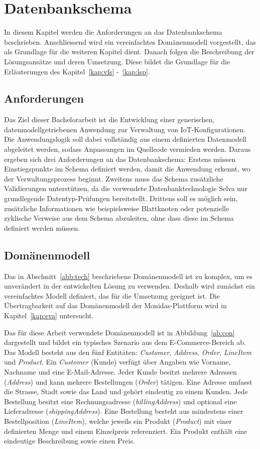 \section{Datenbankschema}
\label{kap:dbschema}
In diesem Kapitel werden die Anforderungen an das Datenbankschema beschrieben. Anschliessend wird ein vereinfachtes Domänenmodell vorgestellt, das als Grundlage für die weiteren Kapitel dient. Danach folgen die Beschreibung der Lösungsansätze und deren Umsetzung. Diese bildet die Grundlage für die Erläuterungen des Kapitel~\ref{kap:vfs} -~\ref{kap:lsp}.

\subsection{Anforderungen}
\label{abb:anforderungen}
Das Ziel dieser Bachelorarbeit ist die Entwicklung einer generischen, datenmodellgetriebenen Anwendung zur Verwaltung von IoT-Konfigurationen. Die Anwendungslogik soll dabei vollständig aus einem definierten Datenmodell abgeleitet werden, sodass Anpassungen im Quellcode vermieden werden. Daraus ergeben sich drei Anforderungen an das Datenbankschema: Erstens müssen Einstiegspunkte im Schema definiert werden, damit die Anwendung erkennt, wo der Verwaltungsprozess beginnt. Zweitens muss das Schema zusätzliche Validierungen unterstützen, da die verwendete Datenbanktechnologie Selva nur grundlegende Datentyp-Prüfungen bereitstellt. Drittens soll es möglich sein, zusätzliche Informationen wie beispielsweise Blattknoten oder potenzielle zyklische Verweise aus dem Schema abzuleiten, ohne dass diese im Schema definiert werden müssen.

\subsection{Domänenmodell}
\label{abb:domaenenmodell}
Das in Abschnitt~\ref{abb:tech} beschriebene Domänenmodell ist zu komplex, um es unverändert in der entwickelten Lösung zu verwenden. Deshalb wird zunächst ein vereinfachtes Modell definiert, das für die Umsetzung geeignet ist. Die Übertragbarkeit auf das Domänenmodell der Monidas-Plattform wird in Kapitel~\ref{kap:eva} untersucht.

Das für diese Arbeit verwendete Domänenmodell ist in Abbildung~\ref{ab:con} dargestellt und bildet ein typisches Szenario aus dem E-Commerce-Bereich ab. Das Modell besteht aus den fünf Entitäten: \textit{Customer}, \textit{Address}, \textit{Order}, \textit{LineItem} und \textit{Product}. Ein \textit{Customer} (Kunde) verfügt über Angaben wie Vorname, Nachname und eine E-Mail-Adresse. Jeder Kunde besitzt mehrere Adressen (\textit{Address}) und kann mehrere Bestellungen (\textit{Order}) tätigen. Eine Adresse umfasst die Strasse, Stadt sowie das Land und gehört eindeutig zu einem Kunden. Jede Bestellung besitzt eine Rechnungsadresse (\textit{billingAddress}) und optional eine Lieferadresse (\textit{shippingAddress}). Eine Bestellung besteht aus mindestens einer Bestellposition (\textit{LineItem}), welche jeweils ein Produkt (\textit{Product}) mit einer definierten Menge und einem Einzelpreis referenziert. Ein Produkt enthält eine eindeutige Beschreibung sowie einen Preis.

